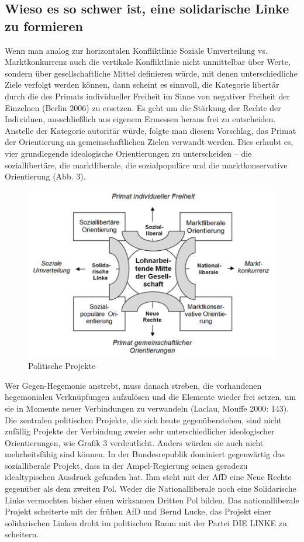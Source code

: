 \begin{multicols*}{2}
\section{Wieso es so schwer ist, eine solidarische Linke zu formieren}

\noindent Wenn man analog zur horizontalen Konfliktlinie Soziale Umverteilung vs. Marktkonkurrenz auch die vertikale Konfliktlinie nicht unmittelbar über Werte, sondern über gesellschaftliche Mittel definieren würde, mit denen unterschiedliche Ziele verfolgt werden können, dann scheint es sinnvoll, die Kategorie libertär durch die des Primats individueller Freiheit im Sinne von negativer Freiheit der Einzelnen (Berlin 2006) zu ersetzen. Es geht um die Stärkung der Rechte der Individuen, ausschließlich aus eigenem Ermessen heraus frei zu entscheiden. Anstelle der Kategorie autoritär würde, folgte man diesem Vorschlag, das Primat der Orientierung an gemeinschaftlichen Zielen verwandt werden. Dies erlaubt es, vier grundlegende ideologische Orientierungen zu unterscheiden – die soziallibertäre, die marktliberale, die sozialpopuläre und die marktkonservative Orientierung (Abb. 3).

\begin{figure}
    \centering
    \caption{Politische Projekte}
    \includegraphics[scale=0.8]{brie3.png} 
\end{figure}

Wer Gegen-Hegemonie anstrebt, muss danach streben, die vorhandenen hegemonialen Verknüpfungen aufzulösen und die Elemente wieder frei setzen, um sie in Momente neuer Verbindungen zu verwandeln (Laclau, Mouffe 2000: 143). Die zentralen politischen Projekte, die sich heute gegenüberstehen, sind nicht zufällig Projekte der Verbindung zweier sehr unterschiedlicher ideologischer Orientierungen, wie Grafik 3 verdeutlicht. Anders würden sie auch nicht mehrheitsfähig sind können. In der Bundesrepublik dominiert gegenwärtig das sozialliberale Projekt, dass in der Ampel-Regierung seinen geradezu idealtypischen Ausdruck gefunden hat. Ihm steht mit der AfD eine Neue Rechte gegenüber als dem zweiten Pol. Weder die Nationalliberale noch eine Solidarische Linke vermochten bisher einen wirksamen Dritten Pol bilden. Das nationalliberale Projekt scheiterte mit der frühen AfD und Bernd Lucke, das Projekt einer solidarischen Linken droht im politischen Raum mit der Partei DIE LINKE zu scheitern.


\end{multicols*}
